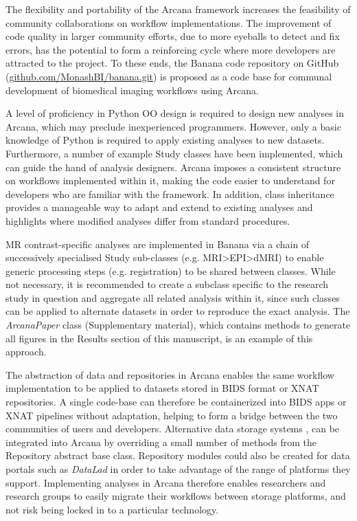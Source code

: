\documentclass[smallextended]{svjour3}       %
\begin{document}
The flexibility and portability of the Arcana framework increases the
feasibility of community collaborations on workflow implementations. The
improvement of code quality in larger community efforts, due to more
eyeballs to detect and fix errors, has the potential to form a
reinforcing cycle where more developers are attracted to the project.
To these ends, the Banana code repository on GitHub
(\url{github.com/MonashBI/banana.git}) is proposed as a code base
for communal development of biomedical imaging workflows using Arcana.

A level of proficiency in Python OO design is required to design new
analyses in Arcana, which may preclude inexperienced programmers.
However, only a basic knowledge of Python is required to apply existing
analyses to new datasets. Furthermore, a number of example Study classes
have been implemented, which can guide the hand of analysis designers.
Arcana imposes a consistent structure on workflows implemented within
it, making the code easier to understand for developers who are familiar
with the framework. In addition, class inheritance provides a manageable
way to adapt and extend to existing analyses and highlights where
modified analyses differ from standard procedures.

MR contrast-specific analyses are implemented in Banana via a chain
of successively specialised Study sub-classes (e.g.
MRI\textgreater{}EPI\textgreater{}dMRI) to enable generic processing
steps (e.g. registration) to be shared between classes. While not
necessary, it is recommended to create a subclass specific to the
research study in question and aggregate all related analysis within it,
since such classes can be applied to alternate datasets in order to
reproduce the exact analysis. The \emph{ArcanaPaper} class
(Supplementary material), which contains methods to generate all figures
in the Results section of this manuscript, is an example of this approach.

The abstraction of data and repositories in Arcana enables the same
workflow implementation to be applied to datasets stored in BIDS format
or XNAT repositories. A single code-base can therefore be containerized
into BIDS apps or XNAT pipelines without adaptation, helping to form a
bridge between the two communities of users and developers. Alternative
data storage systems \citep{scott_coins:_2011,das_loris:_2012,book_neuroinformatics_2013},
can be integrated into Arcana by overriding a small number of
methods from the Repository abstract base class. Repository modules
could also be created for data portals such as \emph{DataLad}
\citep{yaroslav_halchenko_datalad/datalad_2018}
in order to take advantage of the range of platforms they support.
Implementing analyses in Arcana therefore enables researchers and
research groups to easily migrate their workflows between storage
platforms, and not risk being locked in to a particular technology.
\end{document}
